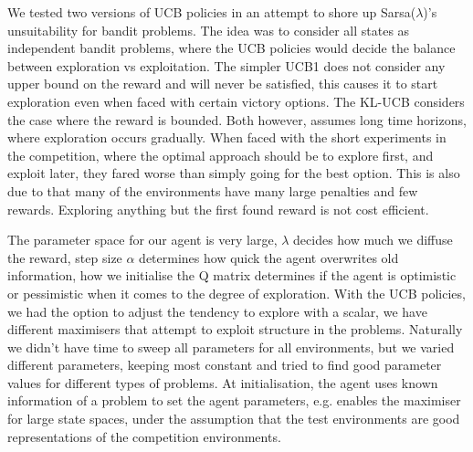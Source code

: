 
We tested two versions of UCB policies in an attempt to shore up
Sarsa($\lambda$)'s unsuitability for bandit problems. The idea was to consider
all states as independent bandit problems, where the UCB policies would decide
the balance between exploration vs exploitation. The simpler UCB1 does not
consider any upper bound on the reward and will never be satisfied, this causes
it to start exploration even when faced with certain victory options. The KL-UCB
considers the case where the reward is bounded. Both however, assumes long time
horizons, where exploration occurs gradually. When faced with the short
experiments in the competition, where the optimal approach should be to explore
first, and exploit later, they fared worse than simply going for the best
option. This is also due to that many of the environments have many large
penalties and few rewards. Exploring anything but the first found reward is not
cost efficient. 

The parameter space for our agent is very large, $\lambda$ decides how much we
diffuse the reward, step size $\alpha$ determines how quick the agent overwrites
old information, how we initialise the Q matrix determines if the agent is
optimistic or pessimistic when it comes to the degree of exploration. With the
UCB policies, we had the option to adjust the tendency to explore with a scalar,
we have different maximisers that attempt to exploit structure in the problems.
Naturally we didn't have time to sweep all parameters for all environments, but
we varied different parameters, keeping most constant and tried to find good
parameter values for different types of problems. At initialisation, the agent
uses known information of a problem to set the agent parameters, e.g. enables
the maximiser for large state spaces, under the assumption that the test
environments are good representations of the competition environments.

